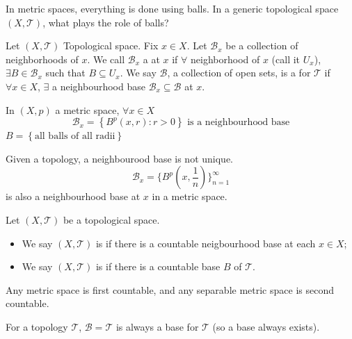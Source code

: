 In metric spaces, everything is done using balls. In a generic topological space $(X, \mathcal{T})$,
what plays the role of balls?

\begin{defn}
    Let $(X, \mathcal{T})$ Topological space. Fix $x \in X$. Let $\mathcal{B}_x$ be a collection of
    neighborhoods of $x$. We call $\mathcal{B}_x$ a  at $x$ if 
    $\forall$ neighborhood of $x$ (call it $U_x$), $\exists B \in \mathcal{B}_x$ such that $B 
    \subseteq U_x$. We say $\mathcal{B}$, a collection of open sets, is a  for 
    $\mathcal{T}$ if 
    $\forall x \in X$, $\exists$ a neighbourhood base $\mathcal{B}_x \subseteq \mathcal{B}$ at $x$.    

\end{defn}

\begin{exmp}
    In $(X, p)$ a metric space, $\forall x \in X$
    \[
        \mathcal{B}_x = \left\{ B^p(x, r) : r > 0  \right\} \text{ is a neighbourhood base}
    \]   
    $B = \left\{ \text{all balls of all radii} \right\} $ 
\end{exmp}

\begin{rem}
    Given a topology, a neighbourood base is not unique.
    \[
        \mathcal{B}_x = \{B^p(x, \frac{1}{n})\}_{n=1}^{\infty} 
    \] 
    is also a neighbourhood base at $x$ in a metric space.
\end{rem}

\begin{defn}
    Let $(X, \mathcal{T})$ be a topological space.
    \begin{itemize}
        \item We say $(X, \mathcal{T})$ is  if there is a countable neigbourhood
        base at each $x \in X$;
        \item We say $(X, \mathcal{T})$ is  if there is a countable base $B$
        of $\mathcal{T}$. 
    \end{itemize}
\end{defn}

\begin{rem}
    Any metric space is first countable, and any separable metric space is second countable. 
\end{rem}

\begin{rem}
    For a topology $\mathcal{T}$, $\mathcal{B} = \mathcal{T}$ is always a base for $\mathcal{T}$ (so 
    a base always exists).  
\end{rem}

